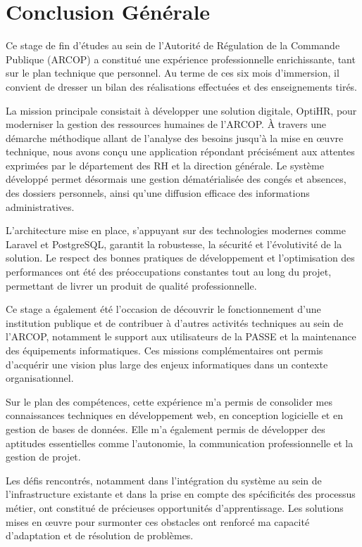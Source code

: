 \chapter{Conclusion Générale}
\clearpage
Ce stage de fin d'études au sein de l'Autorité de Régulation de la Commande Publique (ARCOP) a constitué une expérience professionnelle enrichissante, tant sur le plan technique que personnel. Au terme de ces six mois d'immersion, il convient de dresser un bilan des réalisations effectuées et des enseignements tirés.

La mission principale consistait à développer une solution digitale, OptiHR, pour moderniser la gestion des ressources humaines de l'ARCOP. À travers une démarche méthodique allant de l'analyse des besoins jusqu'à la mise en œuvre technique, nous avons conçu une application répondant précisément aux attentes exprimées par le département des RH et la direction générale. Le système développé permet désormais une gestion dématérialisée des congés et absences, des dossiers personnels, ainsi qu'une diffusion efficace des informations administratives.

L'architecture mise en place, s'appuyant sur des technologies modernes comme Laravel et PostgreSQL, garantit la robustesse, la sécurité et l'évolutivité de la solution. Le respect des bonnes pratiques de développement et l'optimisation des performances ont été des préoccupations constantes tout au long du projet, permettant de livrer un produit de qualité professionnelle.

Ce stage a également été l'occasion de découvrir le fonctionnement d'une institution publique et de contribuer à d'autres activités techniques au sein de l'ARCOP, notamment le support aux utilisateurs de la PASSE et la maintenance des équipements informatiques. Ces missions complémentaires ont permis d'acquérir une vision plus large des enjeux informatiques dans un contexte organisationnel.

Sur le plan des compétences, cette expérience m'a permis de consolider mes connaissances techniques en développement web, en conception logicielle et en gestion de bases de données. Elle m'a également permis de développer des aptitudes essentielles comme l'autonomie, la communication professionnelle et la gestion de projet.

Les défis rencontrés, notamment dans l'intégration du système au sein de l'infrastructure existante et dans la prise en compte des spécificités des processus métier, ont constitué de précieuses opportunités d'apprentissage. Les solutions mises en œuvre pour surmonter ces obstacles ont renforcé ma capacité d'adaptation et de résolution de problèmes.

